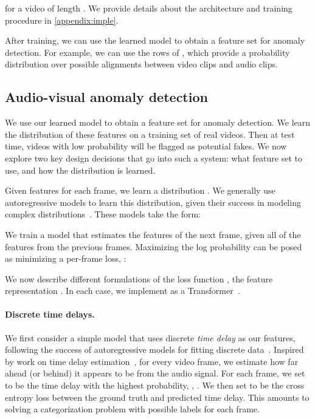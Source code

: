 \documentclass[10pt,twocolumn,letterpaper]{article}
\newcommand{\mypar}[1]{\vspace{-3mm}\paragraph{#1}}
\newcommand{\supparxiv}[2]{#2}
\begin{document}
for a video of length . We provide details about the architecture and training procedure in \supparxiv{the supplement}{\cref{appendix:imple}}.

After training, we can use the learned model to obtain a feature set for anomaly detection. For example, we can use the rows of , which provide a probability distribution over possible alignments between video clips and audio clips.












\subsection{Audio-visual anomaly detection}\label{av_anomaly}

We use our learned model to obtain a feature set for anomaly detection.  We learn the distribution of these features on a training set of real videos. Then at test time, videos with low probability will be flagged as potential fakes. We now explore two key design decisions that go into such a system: what feature set to use, and how the distribution is learned. 

Given features for each frame, we learn a distribution . We generally use autoregressive models to learn this distribution, given their success in modeling complex distributions~\cite{brown2020language,yu2022scaling}. These models take the form: 

We train a model  that estimates the features of the next frame, given all of the features from the previous frames. Maximizing the log probability can be posed as minimizing a per-frame loss, :


 We now describe different formulations of the loss function , the feature representation . In each case, we implement  as a Transformer~\cite{vaswani2017attention}.




















\mypar{Discrete time delays.} 
We first consider a simple model that uses discrete {\em time delay} as our features, following the success of autoregressive models for fitting discrete data~\cite{van2017neural, razavi2019generating, esser2021taming}. Inspired by work on time delay estimation~\cite{knapp1976generalized,chen2022sound}, for every video frame, we estimate how far ahead (or behind) it appears to be from the audio signal. For each frame, we set  to be the time delay with the highest probability, \ie, . We then set  to be the cross entropy loss between the ground truth and predicted time delay. This amounts to solving a categorization problem with  possible labels for each frame.
\end{document}
